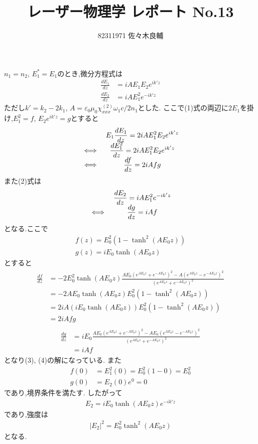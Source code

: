 \documentclass[uplatex,a4j,11pt,dvipdfmx]{jsarticle}
\begin{document}
\title{レーザー物理学 レポート No.13}
\author{82311971 佐々木良輔}
\date{}
\maketitle
$n_1=n_2$, $E_1^*=E_1$のとき,微分方程式は
\begin{align}
  \frac{dE_1}{dz}&=iAE_1E_2e^{ik'z}\\
  \frac{dE_2}{dz}&=iAE_1^2e^{-ik'z}
\end{align}
ただし$k'=k_2-2k_1$, $A=\varepsilon_0\mu_0\chi_{xxx}^{(2)}\omega_1c/2n_1$とした.
ここで(1)式の両辺に$2E_1$を掛け,$E_1^2=f$, $E_2e^{ik'z}=g$とすると
\begin{align}
  \everymath{\displaystyle}
  \begin{array}{cc}
    &E_1\frac{dE_1}{dz}=2iAE_1^2E_2e^{ik'z}\\
    \iff&\frac{dE_1^2}{dz}=2iAE_1^2E_2e^{ik'z}\\
    \iff&\frac{df}{dz}=2iAfg
  \end{array}
\end{align}
また(2)式は
\begin{align}
  \everymath{\displaystyle}
  \begin{array}{cc}
    &\frac{dE_2}{dz}=iAE_1^2e^{-ik'z}\\
    \iff&\frac{dg}{dz}=iAf
  \end{array}
\end{align}
となる.ここで
\begin{align}
  f(z)=E_0^2(1-\tanh^2(AE_0z))\\
  g(z)=iE_0\tanh(AE_0z)
\end{align}
とすると
\begin{align}
  \begin{split}
    \frac{df}{dz}&=-2E_0^2\tanh(AE_0z)\frac{AE_0(e^{AE_0z}+e^{-AE_0z})^2-A(e^{AE_0z}-e^{-AE_0z})^2}{(e^{AE_0z}+e^{-AE_0z})^2}\\
    &=-2AE_0\tanh(AE_0z)E_0^2\left(1-\tanh^2(AE_0z)\right)\\
    &=2iA(iE_0\tanh(AE_0z))E_0^2\left(1-\tanh^2(AE_0z)\right)\\
    &=2iAfg
  \end{split}
\end{align}
\begin{align}
  \begin{split}
    \frac{dg}{dz}&=iE_0\frac{AE_0(e^{AE_0z}+e^{-AE_0z})^2-AE_0(e^{AE_0z}-e^{-AE_0z})^2}{(e^{AE_0z}+e^{-AE_0z})^2}\\
    &=iAf
  \end{split}
\end{align}
となり(3), (4)の解になっている.
また
\begin{align}
  f(0)&=E_1^2(0)=E_0^2(1-0)=E_0^2\\
  g(0)&=E_2(0)e^0=0
\end{align}
であり,境界条件を満たす.
したがって
\begin{align}
  E_2=iE_0\tanh(AE_0z)e^{-ik'z}
\end{align}
であり,強度は
\begin{align}
  |E_2|^2=E_0^2\tanh^2(AE_0z)
\end{align}
となる.
\end{document}
